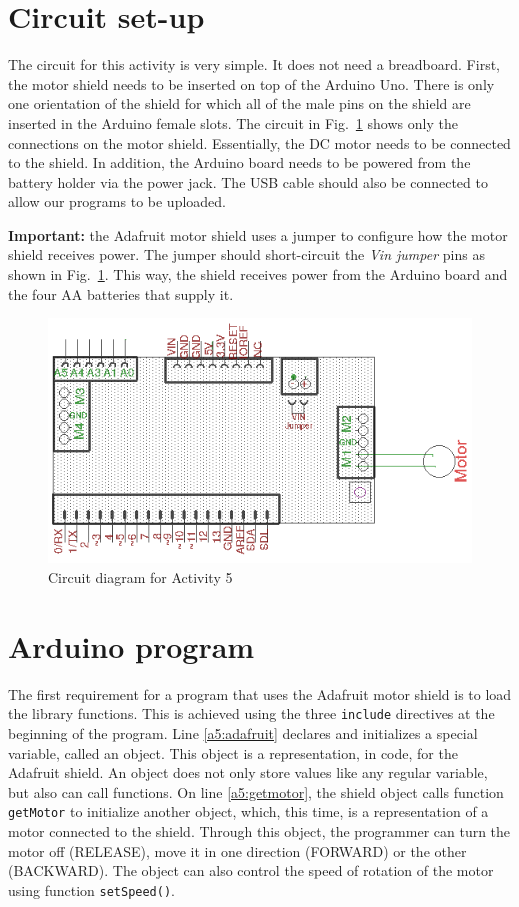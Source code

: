 \documentclass[12pt]{book}
\begin{document}
\section{Circuit set-up}

The circuit for this activity is very simple. It does not need a
breadboard. First, the motor shield needs to be inserted on top of the
Arduino Uno. There is only one orientation of the shield for which all
of the male pins on the shield are inserted in the Arduino female
slots. The circuit in Fig.~\ref*{fig:SchemEx5} shows only the
connections on the motor shield. Essentially, the DC motor needs to be
connected to the shield. In addition, the Arduino board needs to be
powered from the battery holder via the power jack. The USB cable
should also be connected to allow our programs to be uploaded.

\textbf{Important:} the Adafruit motor shield uses a jumper to
configure how the motor shield receives power. The jumper should
short-circuit the \emph{Vin jumper} pins as shown in
Fig.~\ref*{fig:SchemEx5}. This way, the shield receives power from the
Arduino board and the four AA batteries that supply it. 

\begin{figure}
	 \centering
	\includegraphics{schem/Experiment5.png}
	\caption{Circuit diagram for Activity 5}
	\label{fig:SchemEx5}
\end{figure}


\section{Arduino program}

The first requirement for a program that uses the Adafruit motor
shield is to load the library functions. This is achieved using the
three \lstinline$include$ directives at the beginning of the
program. Line \ref*{a5:adafruit} declares and initializes a special
variable, called an object. This object is a representation, in code,
for the Adafruit shield. An object does not only store values like
any regular variable, but also can call functions. On line
\ref*{a5:getmotor}, the shield object calls function
\lstinline$getMotor$ to initialize another object, which, this time,
is a representation of a motor connected to the shield. Through this
object, the programmer can turn the motor off (RELEASE), move it in one direction (FORWARD) or the other (BACKWARD). The object can also
control the speed of rotation of the motor using function \lstinline$setSpeed()$. 
\end{document}
